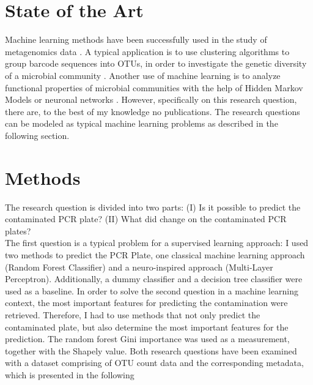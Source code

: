\documentclass{svproc}
\begin{document}
\section{State of the Art}
Machine learning methods have been successfully used in the study of metagenomics data  \cite{Soueidan2017}. A typical application is to use clustering algorithms to group barcode sequences into OTUs, in order to investigate the genetic diversity of a microbial community \cite{Soueidan2017}. Another use of machine learning is to analyze functional properties of microbial communities with the help of Hidden Markov Models or neuronal networks \cite{Soueidan2017}. However, specifically on this research question, there are, to the best of my knowledge no publications. The research questions can be modeled as typical machine learning problems as described in the following section.

%
%
\section{Methods}

The research question is divided into two parts: (I) Is it possible to predict the contaminated PCR plate? (II) What did change on the contaminated PCR plates? \\
The first question is a typical problem for a supervised learning approach: I used two methods to predict the PCR Plate, one classical machine learning approach (Random Forest Classifier) and a neuro-inspired approach (Multi-Layer Perceptron).  Additionally, a dummy classifier and a decision tree classifier were used as a baseline.
In order to solve the second question in a machine learning context, the most important features for predicting the contamination were retrieved. Therefore, I had to use methods that not only predict the contaminated plate, but also determine the most important features for the prediction. The random forest Gini importance was used as a measurement, together with the Shapely value.
Both research questions have been examined with a dataset comprising of OTU count data and the corresponding metadata, which is presented in the following\\

\end{document}
